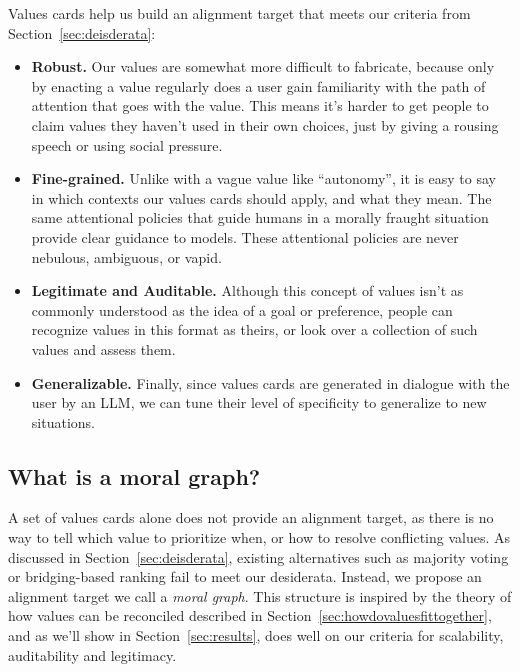 \documentclass{article}
\theoremstyle{definition}
\begin{document}
Values cards help us build an alignment target that meets our criteria from Section~\ref{sec:deisderata}:

\begin{itemize}
    \item \textbf{Robust.} Our values are somewhat more difficult to fabricate, because only by enacting a value regularly does a user gain familiarity with the path of attention that goes with the value. This means it’s harder to get people to claim values they haven't used in their own choices, just by giving a rousing speech or using social pressure.
\item \textbf{Fine-grained.} Unlike with a vague value like “autonomy”, it is easy to say in which contexts our values cards should apply, and what they mean. The same attentional policies that guide humans in a morally fraught situation provide clear guidance to models. These attentional policies are never nebulous, ambiguous, or vapid.
\item \textbf{Legitimate and Auditable.} Although this concept of values isn't as commonly understood as the idea of a goal or preference, people can recognize values in this format as theirs, or look over a collection of such values and assess them. 
\item \textbf{Generalizable.} Finally, since values cards are generated in dialogue with the user by an LLM, we can tune their level of specificity to generalize to new situations.
\end{itemize}



\subsection{What is a moral graph?}\label{sec:themoralgraph}

A set of values cards alone does not provide an alignment target, as there is no way to tell which value to prioritize when, or how to resolve conflicting values. As discussed in Section~\ref{sec:deisderata}, existing alternatives such as majority voting or bridging-based ranking fail to meet our desiderata. Instead, we propose an alignment target we call a \textit{moral graph}. This structure is inspired by the theory of how values can be reconciled described in Section~\ref{sec:howdovaluesfittogether}, and as we’ll show in Section~\ref{sec:results}, does well on our criteria for scalability, auditability and legitimacy.
\end{document}
